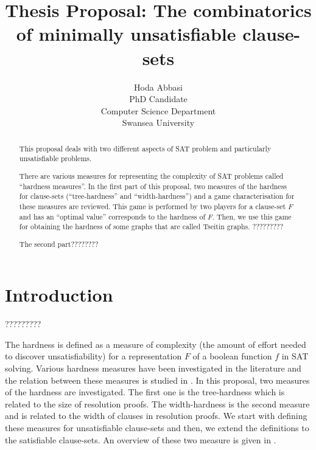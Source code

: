 \documentclass{report}
\begin{document}
\title{Thesis Proposal: The combinatorics of minimally unsatisfiable clause-sets
       }

\author{Hoda Abbasi\\
        PhD Candidate\\
        Computer Science Department\\
        Swansea University\\}
\maketitle


\begin{abstract}
This proposal deals with two different aspects of SAT problem and particularly unsatisfiable problems. 

There are various measures for representing the complexity of SAT problems called ``hardness measures''. In the first part of this proposal, two measures of the hardness for clause-sets (``tree-hardness'' and ``width-hardness'') and a game characterisation for these measures are reviewed. This game is performed by two players for a clause-set $F$ and has an ``optimal value'' corresponds to the hardness of $F$. Then, we use this game for obtaining the hardness of some graphs that are called Tseitin graphs. ?????????

The second part????????


\end{abstract}

\tableofcontents
\chapter{Introduction}
\label{cha:intro}

?????????

The hardness is defined as a measure of complexity (the amount of effort needed to discover unsatisfiability) for a representation $F$ of a boolean function $f$ in SAT solving. Various hardness measures have been investigated in the literature and the relation between these measures is studied in \cite{BeyersdorffGwynneKullmann2013PHPER,BeyersdorffKullmann2014PHP,GwynneKullmann2013GoodRepresentationsIIex}. In this proposal, two measures of the hardness are investigated. The first one is the tree-hardness which is related to the size of resolution proofs. The width-hardness is the second measure and is related to the width of clauses in resolution proofs. We start with defining these measures for unsatisfiable clause-sets and then, we extend the definitions to the satisfiable clause-sets. An overview of these two measure is given in \cite{BeyersdorffGwynneKullmann2013PHPER,BeyersdorffKullmann2014PHP,?? }.
\end{document}
